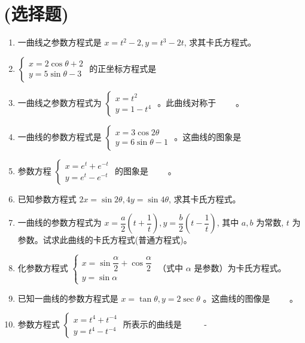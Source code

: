 \documentclass[10pt]{article}
\begin{document}
\section*{(选择题)}
\begin{enumerate}
  \item 一曲线之参数方程式是 $x=t^{2}-2, y=t^{3}-2 t$, 求其卡氏方程式。
  \item $\left\{\begin{array}{l}x=2 \cos \theta+2 \\ y=5 \sin \theta-3\end{array}\right.$ 的正坐标方程式是
  \item 一曲线之参数方程式为 $\left\{\begin{array}{l}x=t^{2} \\ y=1-t^{4}\end{array}\right.$ 。此曲线对称于 $\qquad$。
  \item 一曲线的参数方程式是 $\left\{\begin{array}{l}x=3 \cos 2 \theta \\ y=6 \sin \theta-1\end{array}\right.$ 。这曲线的图象是 $\qquad$
  \item 参数方程 $\left\{\begin{array}{l}x=e^{t}+e^{-t} \\ y=e^{t}-e^{-t}\end{array}\right.$ 的图象是 $\qquad$。
  \item 已知参数方程式 $2 x=\sin 2 \theta, 4 y=\sin 4 \theta$, 求其卡氏方程式。
  \item 一曲线的参数方程式为 $x=\dfrac{a}{2}\left(t+\dfrac{1}{t}\right), y=\dfrac{b}{2}\left(t-\dfrac{1}{t}\right)$, 其中 $a, b$ 为常数, $t$ 为参数。试求此曲线的卡氏方程式(普通方程式)。
  \item 化参数方程式 $\left\{\begin{array}{l}x=\sin \dfrac{\alpha}{2}+\cos \dfrac{\alpha}{2} \\ y=\sin \alpha\end{array}\right.$ （式中 $\alpha$ 是参数）为卡氏方程式。
  \item 已知一曲线的参数方程式是 $x=\tan \theta, y=2 \sec \theta$ 。这曲线的图像是 $\qquad$。
  \item 参数方程式 $\left\{\begin{array}{l}x=t^{4}+t^{-4} \\ y=t^{4}-t^{-4}\end{array}\right.$ 所表示的曲线是 $\qquad$ -
\end{enumerate}
\end{document}
